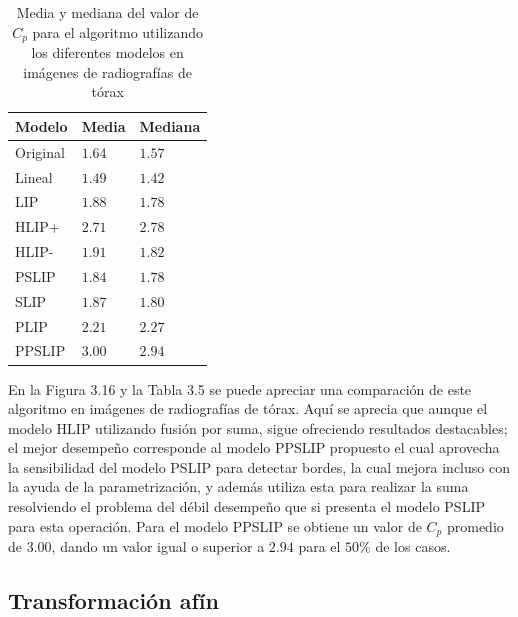\begin{table}
	\begin{center}
		\begin{tabular}{|l|l|l|}
			\hline 
			Modelo & Media & Mediana\\
			\hline
			Original & $1.64$ & $1.57$\\
			\hline
			Lineal & $1.49$ & $1.42$\\
			\hline
			LIP & $1.88$ & $1.78$\\
			\hline
			HLIP+ & $2.71$ & $2.78$\\
			\hline
			HLIP- & $1.91$ & $1.82$\\
			\hline
			PSLIP & $1.84$ & $1.78$\\
			\hline
			SLIP & $1.87$ & $1.80$\\
			\hline
			PLIP & $2.21$ & $2.27$\\
			\hline
			PPSLIP & $3.00$ & $2.94$\\
			\hline
		\end{tabular}
		\caption{Media y mediana del valor de $C_p$ para el algoritmo  utilizando los diferentes modelos en im\'agenes de radiograf\'ias de t\'orax}
	\end{center}
\end{table}

En la Figura 3.16 y la Tabla 3.5 se puede apreciar una comparaci\'on de este algoritmo en im\'agenes de radiograf\'ias de t\'orax. Aqu\'i se aprecia que aunque el modelo HLIP  utilizando fusi\'on por suma, sigue ofreciendo resultados destacables; el mejor desempe\~no corresponde al modelo PPSLIP propuesto el cual aprovecha la sensibilidad del modelo PSLIP para detectar bordes, la cual mejora incluso con la ayuda de la parametrizaci\'on, y adem\'as utiliza esta para realizar la suma resolviendo el problema del d\'ebil desempe\~no que si presenta el modelo PSLIP para esta operaci\'on. Para el modelo PPSLIP se obtiene un valor de $C_p$ promedio de $3.00$, dando un valor igual o superior a $2.94$ para el $50\%$ de los casos.

\subsection{Transformaci\'on af\'in}

